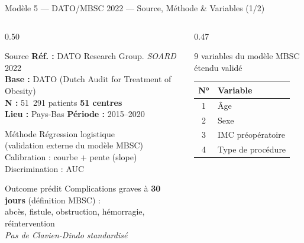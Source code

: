 \documentclass[aspectratio=169]{beamer}
\begin{document}
\begin{frame}{Modèle 5 --- DATO/MBSC 2022 --- Source, Méthode \& Variables (1/2)}
  \begin{columns}[T]
    \begin{column}{0.50\textwidth}
      \begin{block}{Source}
        \footnotesize
        \textbf{Réf. :} DATO Research Group. \textit{SOARD} 2022\\
        \textbf{Base :} DATO (Dutch Audit for Treatment of Obesity)\\
        \textbf{N :} 51~291 patients \quad \textbf{51 centres}\\
        \textbf{Lieu :} Pays-Bas \quad \textbf{Période :} 2015--2020
      \end{block}
      \vspace{0.3em}
      \begin{block}{Méthode}
        \footnotesize
        Régression logistique\\
        (validation externe du modèle MBSC)\\[4pt]
        Calibration : courbe + pente (slope)\\
        Discrimination : AUC
      \end{block}
      \vspace{0.3em}
      \begin{block}{Outcome prédit}
        \footnotesize
        Complications graves à \textbf{30 jours} (définition MBSC) :\\
        abcès, fistule, obstruction, hémorragie, réintervention\\[4pt]
        \textcolor{rougealerte}{\textit{Pas de Clavien-Dindo standardisé}}
      \end{block}
    \end{column}
    \begin{column}{0.47\textwidth}
      \begin{block}{9 variables du modèle MBSC étendu validé}
        \footnotesize
        \begin{tabular}{cl}
          \toprule
          \textbf{N°} & \textbf{Variable} \\
          \midrule
          1 & Âge \\
          2 & Sexe \\
          3 & IMC préopératoire \\
          4 & Type de procédure \\

\end{tabular}
\end{block}
\end{column}
\end{columns}
\end{frame}
\end{document}
